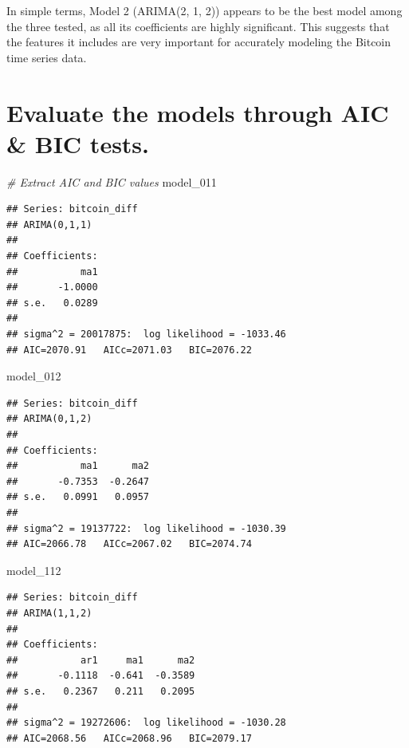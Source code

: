 \documentclass[
]{book}
\newenvironment{Shaded}{\begin{snugshade}}{\end{snugshade}}
\newcommand{\CommentTok}[1]{\textcolor[rgb]{0.56,0.35,0.01}{\textit{#1}}}
\newcommand{\NormalTok}[1]{#1}
\begin{document}
In simple terms, Model 2 (ARIMA(2, 1, 2)) appears to be the best model among the three tested, as all its coefficients are highly significant. This suggests that the features it includes are very important for accurately modeling the Bitcoin time series data.

\section{Evaluate the models through AIC \& BIC tests.}\label{evaluate-the-models-through-aic-bic-tests.}

\begin{Shaded}
\begin{Highlighting}[]
\CommentTok{\# Extract AIC and BIC values}
\NormalTok{model\_011}
\end{Highlighting}
\end{Shaded}

\begin{verbatim}
## Series: bitcoin_diff 
## ARIMA(0,1,1) 
## 
## Coefficients:
##           ma1
##       -1.0000
## s.e.   0.0289
## 
## sigma^2 = 20017875:  log likelihood = -1033.46
## AIC=2070.91   AICc=2071.03   BIC=2076.22
\end{verbatim}

\begin{Shaded}
\begin{Highlighting}[]
\NormalTok{model\_012}
\end{Highlighting}
\end{Shaded}

\begin{verbatim}
## Series: bitcoin_diff 
## ARIMA(0,1,2) 
## 
## Coefficients:
##           ma1      ma2
##       -0.7353  -0.2647
## s.e.   0.0991   0.0957
## 
## sigma^2 = 19137722:  log likelihood = -1030.39
## AIC=2066.78   AICc=2067.02   BIC=2074.74
\end{verbatim}

\begin{Shaded}
\begin{Highlighting}[]
\NormalTok{model\_112}
\end{Highlighting}
\end{Shaded}

\begin{verbatim}
## Series: bitcoin_diff 
## ARIMA(1,1,2) 
## 
## Coefficients:
##           ar1     ma1      ma2
##       -0.1118  -0.641  -0.3589
## s.e.   0.2367   0.211   0.2095
## 
## sigma^2 = 19272606:  log likelihood = -1030.28
## AIC=2068.56   AICc=2068.96   BIC=2079.17
\end{verbatim}
\end{document}
